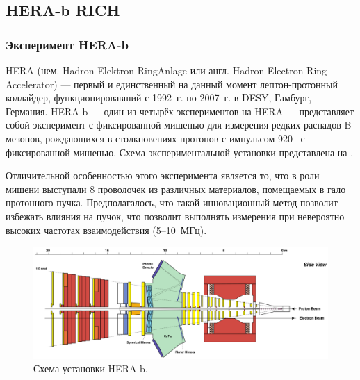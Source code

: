 

\subsection{HERA-b RICH}\label{sec:HerabRich}


\subsubsection{Эксперимент HERA-b}


HERA (нем. Hadron-Elektron-RingAnlage или англ. Hadron-Electron Ring Accelerator) --- первый и единственный на данный момент лептон-протонный коллайдер, функционировавший с 1992~г. по 2007~г. в DESY, Гамбург, Германия. HERA-b --- один из четырёх экспериментов на HERA --- представляет собой эксперимент с фиксированной мишенью для измерения редких распадов B-мезонов, рождающихся в столкновениях протонов с импульсом 920~\GeVoverC{} с фиксированной мишенью.
Схема экспериментальной установки представлена на .

Отличительной особенностью этого эксперимента является то, что в роли мишени выступали 8 проволочек из различных материалов, помещаемых в гало протонного пучка. Предполагалось, что такой инновационный метод позволит избежать влияния на пучок, что позволит выполнять измерения при невероятно высоких частотах взаимодействия (5--10~МГц).
\todo



\begin{figure}[H]
\centering
\includegraphics[width=1.0\textwidth]{pictures/HERA_b_setup.png}
\caption{Схема установки HERA-b.}
\label{fig:HERAbSetup}
\end{figure}

